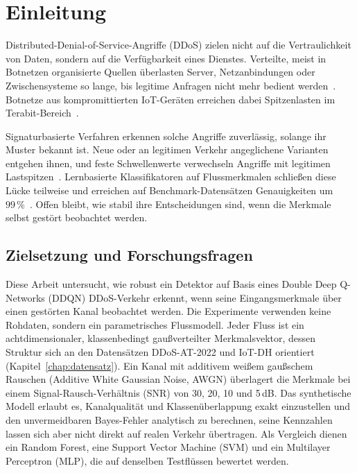 \chapter{Einleitung}
\label{chap:einleitung}

Distributed-Denial-of-Service-Angriffe (DDoS) zielen nicht auf die Vertraulichkeit von Daten, sondern auf die Verfügbarkeit eines Dienstes. Verteilte, meist in Botnetzen organisierte Quellen überlasten Server, Netzanbindungen oder Zwischensysteme so lange, bis legitime Anfragen nicht mehr bedient werden~\autocite{mirkovicTaxonomyDDoSAttack2004}. Botnetze aus kompromittierten IoT-Geräten erreichen dabei Spitzenlasten im Terabit-Bereich~\autocite{balaAITechniquesIoTbased2024}.

Signaturbasierte Verfahren erkennen solche Angriffe zuverlässig, solange ihr Muster bekannt ist. Neue oder an legitimen Verkehr angeglichene Varianten entgehen ihnen, und feste Schwellenwerte verwechseln Angriffe mit legitimen Lastspitzen~\autocite{mirkovicTaxonomyDDoSAttack2004, kumarComprehensiveReviewVulnerabilities2024}. Lernbasierte Klassifikatoren auf Flussmerkmalen schließen diese Lücke teilweise und erreichen auf Benchmark-Datensätzen Genauigkeiten um $99\,\%$~\autocite{koComparativeStudyAIEnabled2023, balaAITechniquesIoTbased2024}. Offen bleibt, wie stabil ihre Entscheidungen sind, wenn die Merkmale selbst gestört beobachtet werden.

\section{Zielsetzung und Forschungsfragen}
Diese Arbeit untersucht, wie robust ein Detektor auf Basis eines Double Deep Q-Networks (DDQN) DDoS-Verkehr erkennt, wenn seine Eingangsmerkmale über einen gestörten Kanal beobachtet werden. Die Experimente verwenden keine Rohdaten, sondern ein parametrisches Flussmodell. Jeder Fluss ist ein achtdimensionaler, klassenbedingt gaußverteilter Merkmalsvektor, dessen Struktur sich an den Datensätzen \mbox{DDoS-AT-2022} und \mbox{IoT-DH} orientiert (Kapitel~\ref{chap:datensatz}). Ein Kanal mit additivem weißem gaußschem Rauschen (Additive White Gaussian Noise, AWGN) überlagert die Merkmale bei einem Signal-Rausch-Verhältnis (SNR) von 30, 20, 10 und 5\,dB. Das synthetische Modell erlaubt es, Kanalqualität und Klassenüberlappung exakt einzustellen und den unvermeidbaren Bayes-Fehler analytisch zu berechnen, seine Kennzahlen lassen sich aber nicht direkt auf realen Verkehr übertragen. Als Vergleich dienen ein Random Forest, eine Support Vector Machine (SVM) und ein Multilayer Perceptron (MLP), die auf denselben Testflüssen bewertet werden.

